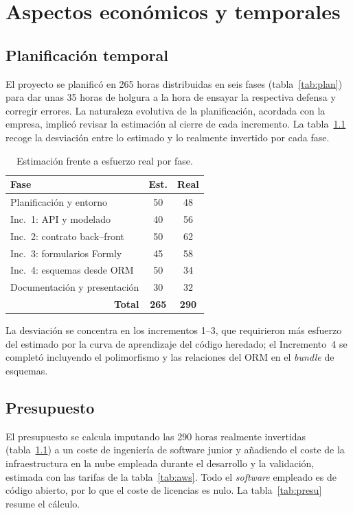\chapter{Aspectos económicos y temporales}

\section{Planificación temporal}
El proyecto se planificó en 265 horas distribuidas en seis fases
(tabla~\ref{tab:plan}) para dar unas 35 horas de holgura a la hora de ensayar
la respectiva defensa y corregir errores. La naturaleza evolutiva de la planificación, acordada
con la empresa, implicó revisar la estimación al cierre de cada incremento.
La tabla~\ref{tab:desv} recoge la desviación entre lo estimado y lo realmente
invertido por cada fase.

\begin{table}[!htbp]
\caption{Estimación frente a esfuerzo real por fase.}
\label{tab:desv}
\centering
\begin{tabular}{|p{5.2cm}|c|c|}
\hline
\textbf{Fase} & \textbf{Est.} & \textbf{Real} \\ \hline
Planificación y entorno & 50 & 48 \\ \hline
Inc.~1: API y modelado & 40 & 56 \\ \hline
Inc.~2: contrato back--front & 50 & 62 \\ \hline
Inc.~3: formularios Formly & 45 & 58 \\ \hline
Inc.~4: esquemas desde ORM & 50 & 34 \\ \hline
Documentación y presentación & 30 & 32 \\ \hline
\multicolumn{1}{|r|}{\textbf{Total}} & \textbf{265} & \textbf{290} \\ \hline
\end{tabular}
\end{table}

La desviación se concentra en los incrementos 1--3, que requirieron más
esfuerzo del estimado por la curva de aprendizaje del código heredado; el
Incremento~4 se completó incluyendo el polimorfismo y las relaciones del ORM
en el \emph{bundle} de esquemas.

\section{Presupuesto}
El presupuesto se calcula imputando las 290 horas realmente invertidas
(tabla~\ref{tab:desv}) a un coste de ingeniería de software junior y añadiendo
el coste de la infraestructura en la nube empleada durante el desarrollo y la
validación, estimada con las tarifas de la tabla~\ref{tab:aws}. Todo el
\emph{software} empleado es de código abierto, por lo que el coste de licencias
es nulo. La tabla~\ref{tab:presu} resume el cálculo.

